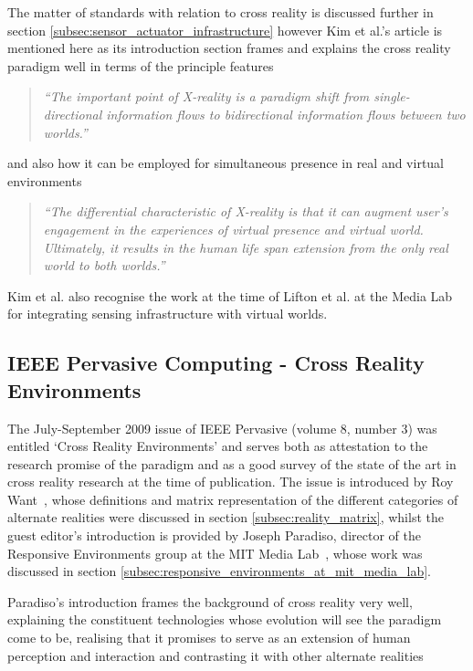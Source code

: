 The matter of standards with relation to cross reality is discussed further in section \ref{subsec:sensor_actuator_infrastructure} however Kim et al.'s article is mentioned here as its introduction section frames and explains the cross reality paradigm well in terms of the principle features

\begin{quote}
\textit{``The important point of X-reality is a paradigm shift from single-directional information flows to bidirectional information flows between two worlds.''}
\end{quote}

and also how it can be employed for simultaneous presence in real and virtual environments

\begin{quote}
\textit{``The differential characteristic of X-reality is that it can augment user's engagement in the experiences of virtual presence and virtual world. Ultimately, it results in the human life span extension from the only real world to both worlds.''}
\end{quote}

Kim et al. also recognise the work at the time of Lifton et al. at the Media Lab for integrating sensing infrastructure with virtual worlds.

\subsection{IEEE Pervasive Computing - Cross Reality Environments}
\label{subsec:ieee_pervasive_computing_-_cross_reality_environments}
The July-September 2009 issue of IEEE Pervasive (volume 8, number 3) was entitled `Cross Reality Environments' and serves both as attestation to the research promise of the paradigm and as a good survey of the state of the art in cross reality research at the time of publication. The issue is introduced by Roy Want~\cite{Want2009}, whose definitions and matrix representation of the different categories of alternate realities were discussed in section \ref{subsec:reality_matrix}, whilst the guest editor's introduction is provided by Joseph Paradiso, director of the Responsive Environments group at the MIT Media Lab~\cite{Paradiso2009}, whose work was discussed in section \ref{subsec:responsive_environments_at_mit_media_lab}.

Paradiso's introduction frames the background of cross reality very well, explaining the constituent technologies whose evolution will see the paradigm come to be, realising that it promises to serve as an extension of human perception and interaction and contrasting it with other alternate realities

